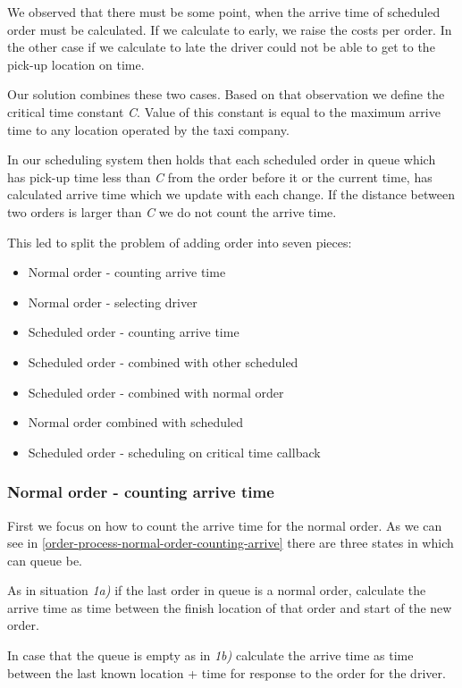 We observed that there must be some point, when the arrive time of scheduled order must be calculated. If we calculate to early, we raise the costs per order. In the other case if we calculate to late the driver could not be able to get to the pick-up location on time. 

Our solution combines these two cases. Based on that observation we define the critical time constant \textit{C}. Value of this constant is equal to the maximum arrive time to any location operated by the taxi company. 

In our scheduling system then holds that each scheduled order in queue which has pick-up time less than \textit{C} from the order before it or the current time, has calculated arrive time which we update with each change. If the distance between two orders is larger than \textit{C} we do not count the arrive time.

This led to split the problem of adding order into seven pieces:
\begin{itemize}
	\item Normal order - counting arrive time
	\item Normal order - selecting driver
	\item Scheduled order - counting arrive time
	\item Scheduled order - combined with other scheduled
	\item Scheduled order - combined with normal order
	\item Normal order combined with scheduled
	\item Scheduled order - scheduling on critical time callback 
\end{itemize}

	\subsubsection{Normal order - counting arrive time}
	
	First we focus on how to count the arrive time for the normal order. As we can see in \ref{order-process-normal-order-counting-arrive} there are three states in which can queue be.
	
	As in situation \textit{1a)} if the last order in queue is a normal order, calculate the arrive time as time between the finish location of that order and start of the new order.
	
	In case that the queue is empty as in \textit{1b)} calculate the arrive time as time between the last known location + time for response to the order for the driver.
	
